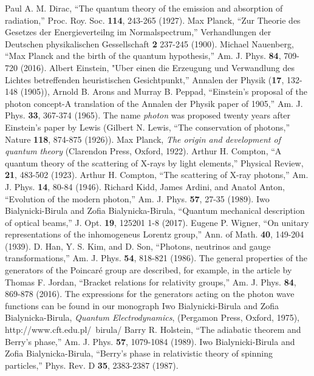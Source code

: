 \documentclass[twocolumn,aps,pra,10pt]{revtex4-1}
\begin{document}
\begin{thebibliography}{00}
 Paul A. M. Dirac, ``The quantum theory of the emission and absorption of radiation,'' Proc. Roy. Soc. {\bf 114}, 243-265 (1927).
 Max Planck, ``Zur Theorie des Gesetzes der Energieverteilng im Normalspectrum,'' Verhandlungen der Deutschen physikalischen Gessellschaft {\bf 2} 237-245 (1900).
 Michael Nauenberg, ``Max Planck and the birth of the quantum hypothesis,'' Am. J. Phys. {\bf 84}, 709-720 (2016).
 Albert Einstein, "Uber einen die Erzeugung und Verwandlung des Lichtes betreffenden heuristischen Gesichtpunkt,'' Annalen der Physik ({\bf 17}, 132-148 (1905)), Arnold B. Arons and Murray B. Peppad, ``Einstein's proposal of the photon concept-A translation of the Annalen der Physik paper of 1905,'' Am. J. Phys. {\bf 33}, 367-374 (1965).
 The name {\em photon} was proposed twenty years after Einstein's paper  by Lewis (Gilbert N. Lewis, ``The conservation of photons,'' Nature {\bf 118}, 874-875 (1926)).
 Max Planck, {\em The origin and development of quantum theory} (Clarendon Press, Oxford, 1922).
 Arthur H. Compton, ``A quantum theory of the scattering of X-rays by light elements,'' Physical Review, {\bf 21}, 483-502 (1923).
 Arthur H. Compton, ``The scattering of X-ray photons,'' Am. J. Phys. {\bf 14}, 80-84 (1946).
 Richard Kidd, James Ardini, and Anatol Anton,  ``Evolution of the modern photon,'' Am. J. Phys. {\bf 57}, 27-35 (1989).
 Iwo Bialynicki-Birula and Zofia Bialynicka-Birula, ``Quantum mechanical description of optical beams,'' J. Opt. {\bf 19}, 125201 1-8 (2017).
 Eugene P. Wigner, ``On unitary representations of the inhomogeneus Lorentz group,'' Ann. of Math. {\bf 40}, 149-204 (1939).
 D. Han, Y. S. Kim, and D. Son, ``Photons, neutrinos and gauge transformations,'' Am. J. Phys. {\bf 54}, 818-821 (1986).
 The general properties of the generators of the Poincar\'e group are described, for example, in the article by Thomas F. Jordan, ``Bracket relations for relativity groups,'' Am. J. Phys. {\bf 84}, 869-878 (2016).
 The expressions for the generators acting on the photon wave functions can be found in our monograph Iwo Bialynicki-Birula and Zofia Bialynicka-Birula, {\em Quantum Electrodynamics}, (Pergamon Press, Oxford, 1975), http://www.cft.edu.pl/~birula/
 Barry R. Holstein, ``The adiabatic theorem and Berry’s phase,'' Am. J. Phys. {\bf 57}, 1079-1084 (1989).
 Iwo Bialynicki-Birula and Zofia Bialynicka-Birula, ``Berry's phase in relativistic theory of spinning particles,'' Phys. Rev. D {\bf 35}, 2383-2387 (1987).

\end{thebibliography}
\end{document}
